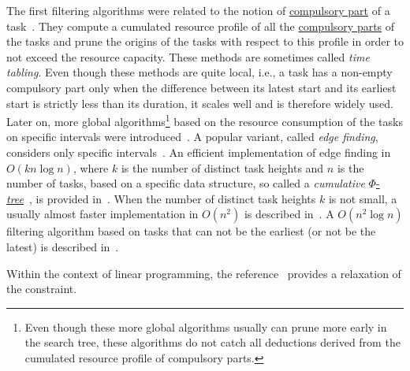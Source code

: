 \begin{ctrdesc}
\item[\pdfmarkup{subject={Algorithm},color=white,markup=Highlight}{Algorithm}{References (or short description) to the filtering algorithm attached to the constraint.}]
The first filtering algorithms were related to the notion of \hyperlink{compulsory_part}{compulsory part}
of a task~\cite{Lahrichi82}. They compute a cumulated resource profile
of all the \hyperlink{compulsory_part}{compulsory parts} of the tasks and prune the origins of the tasks
with respect to this profile in order to not exceed the resource capacity. These methods are sometimes
called \emph{time tabling}.
Even though these methods are quite local, i.e., a task has a non\nobreakdash-empty
compulsory part only when the difference between its latest start and its earliest
start is strictly less than its duration, it scales well and is therefore widely used.
Later on, more global algorithms\footnote{Even though these more global algorithms usually can prune more early
in the search tree, these algorithms do not catch all deductions derived from the cumulated resource profile of
compulsory parts.} based on the resource consumption of the tasks on specific intervals were
introduced~\cite{ErschlerLopez90,CaseauLaburthe96b,Lock96}.
A popular variant, called \emph{edge finding}, considers only specific intervals~\cite{MercierVanHentenryck08}.
An efficient implementation of edge finding in $O(k n\log n)$, where $k$ is the
number of distinct task heights and $n$ is the number of tasks, based on a specific data structure, so called
a \emph{cumulative} \hyperlink{Phi_tree}{$\mathit{\Phi}$\nobreakdash-\emph{tree}}~\cite{Vilim09a},
is provided in~\cite{Vilim09b}. When the number of distinct task heights $k$ is not small,
a usually almost faster implementation in $O(n^2)$ is described in~\cite{KameugneFotsoScottNgoKateu11}.
A $O(n^2\log n)$ filtering algorithm based on tasks that can not be the earliest
(or not be the latest) is described in~\cite{SchuttWolf10}.

Within the context of linear programming, the reference~\cite{HookerYan02}
provides a relaxation of the  constraint.


\end{ctrdesc}
